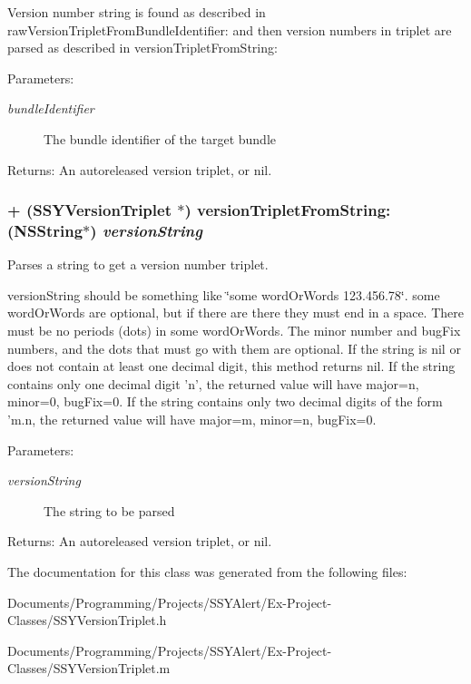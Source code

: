 Version number string is found as described in rawVersionTripletFromBundleIdentifier: and then version numbers in triplet are parsed as described in versionTripletFromString: \begin{Desc}
\item[Parameters:]
\begin{description}
\item[{\em bundleIdentifier}]The bundle identifier of the target bundle \end{description}
\end{Desc}
\begin{Desc}
\item[Returns:]An autoreleased version triplet, or nil. \end{Desc}
\hypertarget{interface_s_s_y_version_triplet_4a2511b3efc1d98cbe6764b9719551e4}{
\subsubsection[{versionTripletFromString:}]{\setlength{\rightskip}{0pt plus 5cm}+ ({\bf SSYVersionTriplet} $\ast$) versionTripletFromString: (NSString$\ast$) {\em versionString}}}
\label{interface_s_s_y_version_triplet_4a2511b3efc1d98cbe6764b9719551e4}


Parses a string to get a version number triplet. 

versionString should be something like \char`\"{}some wordOrWords 123.456.78\char`\"{}. some wordOrWords are optional, but if there are there they must end in a space. There must be no periods (dots) in some wordOrWords. The minor number and bugFix numbers, and the dots that must go with them are optional. If the string is nil or does not contain at least one decimal digit, this method returns nil. If the string contains only one decimal digit 'n', the returned value will have major=n, minor=0, bugFix=0. If the string contains only two decimal digits of the form 'm.n, the returned value will have major=m, minor=n, bugFix=0. \begin{Desc}
\item[Parameters:]
\begin{description}
\item[{\em versionString}]The string to be parsed \end{description}
\end{Desc}
\begin{Desc}
\item[Returns:]An autoreleased version triplet, or nil. \end{Desc}


The documentation for this class was generated from the following files:\begin{CompactItemize}
\item 
Documents/Programming/Projects/SSYAlert/Ex-Project-Classes/SSYVersionTriplet.h\item 
Documents/Programming/Projects/SSYAlert/Ex-Project-Classes/SSYVersionTriplet.m\end{CompactItemize}
